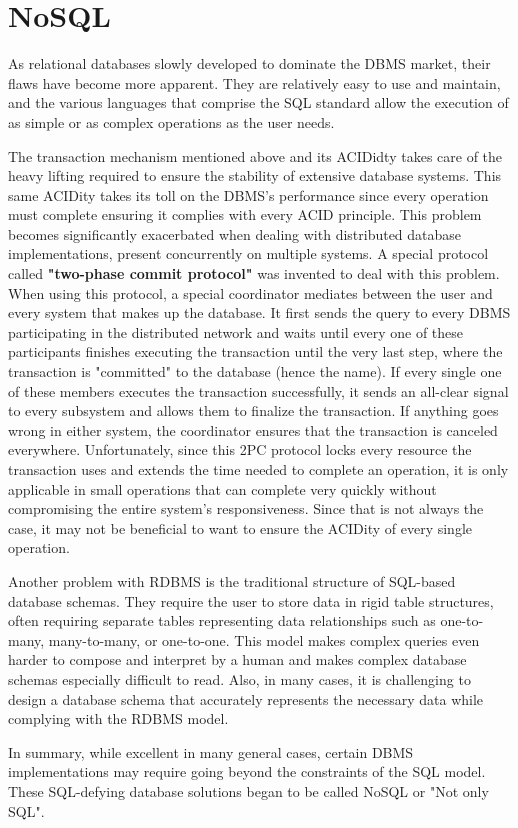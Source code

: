 \section{NoSQL}
\label{sec:background:second_section}
\par As relational databases slowly developed to dominate the DBMS market, their flaws have become more apparent. They are relatively easy to use and maintain, and the various languages that comprise the SQL standard allow the execution of as simple or as complex operations as the user needs. 
\par The transaction mechanism mentioned above and its ACIDidty takes care of the heavy lifting required to ensure the stability of extensive database systems. This same ACIDity takes its toll on the DBMS's performance since every operation must complete ensuring it complies with every ACID principle. This problem becomes significantly exacerbated when dealing with distributed database implementations, present concurrently on multiple systems\citep{HewittCassandra}. A special protocol called \textbf{"two-phase commit protocol"} was invented to deal with this problem. When using this protocol, a special coordinator mediates between the user and every system that makes up the database. It first sends the query to every DBMS participating in the distributed network and waits until every one of these participants finishes executing the transaction until the very last step, where the transaction is "committed" to the database (hence the name). If every single one of these members executes the transaction successfully, it sends an all-clear signal to every subsystem and allows them to finalize the transaction. If anything goes wrong in either system, the coordinator ensures that the transaction is canceled everywhere\citep{TwoPhaseCommit}. Unfortunately, since this 2PC protocol locks every resource the transaction uses and extends the time needed to complete an operation, it is only applicable in small operations that can complete very quickly without compromising the entire system's responsiveness. Since that is not always the case, it may not be beneficial to want to ensure the ACIDity of every single operation\citep{HewittCassandra}.
\par Another problem with RDBMS is the traditional structure of SQL-based database schemas. They require the user to store data in rigid table structures, often requiring separate tables representing data relationships such as one-to-many, many-to-many, or one-to-one. This model makes complex queries even harder to compose and interpret by a human and makes complex database schemas especially difficult to read. Also, in many cases, it is challenging to design a database schema that accurately represents the necessary data while complying with the RDBMS model\citep{HewittCassandra}.
\par In summary, while excellent in many general cases, certain DBMS implementations may require going beyond the constraints of the SQL model. These SQL-defying database solutions began to be called NoSQL or "Not only SQL"\citep{SQLvNOSQL}.

